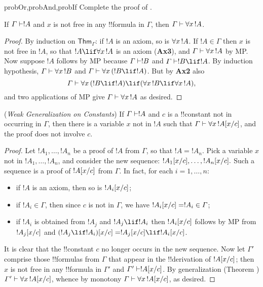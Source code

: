 \documentclass[../../include/open-logic-section]{subfiles}
\begin{document}
\begin{probtag}{probOr,probAnd,probIf}
Complete the proof of .
\end{probtag}

\begin{thm}[Generalization] 
  If $\Gamma \Proves !A$ and $x$ is not free
  in any !!{formula} in $\Gamma$, then $\Gamma \Proves \lforall[x][!A]$.
\end{thm}

\begin{proof}
  By induction on $\mathsf{Thm}_\Gamma$: if $!A$ is an axiom, so
  is $\lforall[x][!A]$. If $!A\in \Gamma$ then $x$ is not free
  in $!A$, so that $!A \lif \lforall[x][!A]$ is an
  axiom (\textbf{Ax3}), and $\Gamma \Proves \lforall[x][!A]$ by
  MP. Now suppose $!A$ follows by MP because $\Gamma \Proves !B$
  and $\Gamma \Proves !B \lif !A$. By induction hypothesis,
  $\Gamma \Proves \lforall[x][!B]$ and $\Gamma \Proves \lforall[x][( !B
  \lif !A)]$. But by \textbf{Ax2} also
  \[
  \Gamma \Proves \lforall[x][( !B \lif !A)] \lif (\lforall[x][
  !B] \lif \lforall[x][!A]),
  \]
and two applications of MP give $\Gamma \Proves \lforall[x][!A]$ as
desired.
\end{proof}

\begin{thm}
  (\emph{Weak Generalization on Constants}) If $\Gamma \Proves !A$
  and $c$ is a !!{constant} not in occurring in $\Gamma$, then there is a
variable $x$ not in $!A$ such that $\Gamma \Proves
\lforall[x][\Subst{!A}{x}{c}]$, and the proof does not involve $c$.
\end{thm}

\begin{proof}
  Let $!A_1,\ldots,!A_n$ be a proof of $!A$ from
  $\Gamma$, so that $!A=!A_n$. Pick a variable $x$ not in
  $!A_1,\ldots,!A_n$, and consider the new sequence:
  $!A_1[x/c],\ldots,!A_n[x/c].$
  Such a sequence is a proof of $!A[x/c]$ from
  $\Gamma$. In fact, for each $i=1,\ldots,n$:
  \begin{itemize}
  \item if $!A$ is an axiom, then so is $!A_i[x/c]$;
  \item if $!A_i \in \Gamma$, then since $c$ is not in $\Gamma$,
    we have $!A_i[x/c] = !A_i \in \Gamma$;
  \item if $!A_i$ is obtained from $!A_j$ and $!A_j
    \lif !A_i$ then $!A_i[x/c]$ follows by MP
    from  $!A_j[x/c]$ and $\Subst{(!A_j
    \lif !A_i)}{x}{c} = \Subst{!A_j}{x}{c}
    \lif \Subst{!A_i}{x}{c}$. 
  \end{itemize}
  It is clear that the !!{constant} $c$ no longer occurs in the new
  sequence.  Now let $\Gamma'$ comprise those !!{formula}s from $\Gamma$
  that appear in the !!{derivation} of $!A[x/c]$; then $x$ is
not free in any !!{formula} in $\Gamma'$ and $\Gamma' \Proves
\Subst{!A}{x}{c}$. By generalization (Theorem
) $\Gamma' \Proves
\lforall[x][\Subst{!A}{x}{c}]$, whence by monotony $\Gamma \Proves
\lforall[x][\Subst{!A}{x}{c}]$, as desired.
\end{proof}
\end{document}
